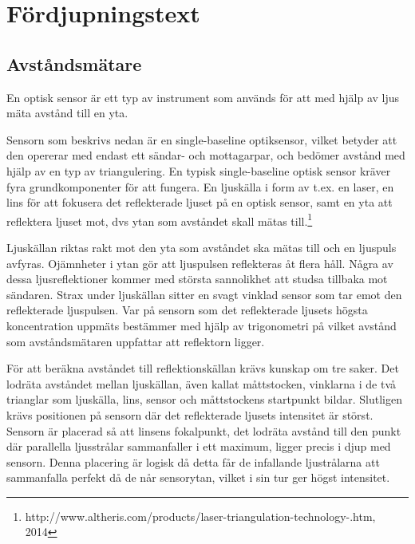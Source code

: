 \documentclass[a4paper,12pt,fleqn]{article}
\begin{document}
\section{Fördjupningstext}
\subsection{Avståndsmätare}
En optisk sensor är ett typ av instrument som används för att med hjälp av ljus mäta avstånd till en yta.

Sensorn som beskrivs nedan är en single-baseline optiksensor, vilket betyder att den opererar med endast ett sändar- och mottagarpar, och bedömer avstånd med hjälp av en typ av triangulering.
En typisk single-baseline optisk sensor kräver fyra grundkomponenter för att fungera.
En ljuskälla i form av t.ex. en laser, en lins för att fokusera det reflekterade ljuset på 
en optisk sensor, samt en yta att reflektera ljuset mot, dvs ytan som avståndet skall mätas till.\footnote{http://www.altheris.com/products/laser-triangulation-technology-.htm, 2014}

Ljuskällan riktas rakt mot den yta som avståndet ska mätas till och en ljuspuls avfyras. Ojämnheter i ytan gör att ljuspulsen reflekteras åt flera håll. Några av dessa ljusreflektioner kommer med största sannolikhet att studsa tillbaka mot sändaren.
Strax under ljuskällan sitter en svagt vinklad sensor som tar emot den reflekterade ljuspulsen.  Var på sensorn som det reflekterade ljusets högsta koncentration uppmäts bestämmer med hjälp av trigonometri på vilket avstånd som avståndsmätaren uppfattar att reflektorn ligger.

För att beräkna avståndet till reflektionskällan krävs kunskap om tre saker.
Det lodräta avståndet mellan ljuskällan, även kallat måttstocken, vinklarna i de två trianglar som ljuskälla, lins, sensor och måttstockens startpunkt bildar. Slutligen krävs positionen på sensorn där det reflekterade ljusets intensitet är störst. Sensorn är placerad så att linsens fokalpunkt, det lodräta avstånd till den punkt där parallella ljusstrålar sammanfaller i ett maximum, ligger precis i djup med sensorn. Denna placering är logisk då detta får de infallande ljustrålarna att sammanfalla perfekt då de når sensorytan, vilket i sin tur ger högst intensitet.
\end{document}

